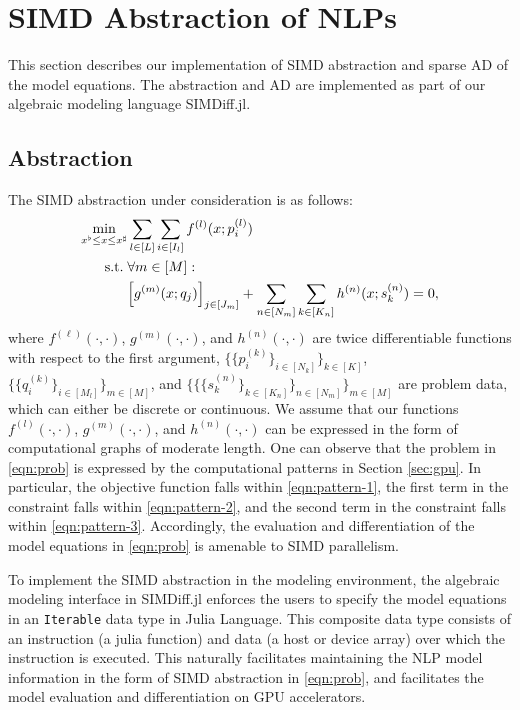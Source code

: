 \section{SIMD Abstraction of NLPs}\label{sec:simd}

This section describes our implementation of SIMD abstraction and
sparse AD of the model equations. The abstraction and AD are
implemented as part of our algebraic modeling language SIMDiff.jl.

\subsection{Abstraction}
The SIMD abstraction under consideration is as follows:
\begin{align}\label{eqn:prob}
  \min_{x^\flat\leq x \leq x^\sharp}
  & \sum_{l\in[L]}\sum_{i\in [I_l]} f^{(l)}(x; p^{(l)}_i)\\\nonumber
  \mathop{\text{\normalfont s.t.}}\; &\forall m\in[M]:\\\nonumber
  &\begin{aligned}[t]
    \left[g^{(m)}(x; q_j)\right]_{j\in [J_m]} +\sum_{n\in [N_m]}\sum_{k\in [K_n]}h^{(n)}(x; s^{(n)}_{k}) =0,
  \end{aligned}
  \end{align}
where $f^{(\ell)}(\cdot,\cdot)$, $g^{(m)}(\cdot,\cdot)$, and
$h^{(n)}(\cdot,\cdot)$ are twice differentiable functions with respect
to the first argument, $\{\{p^{(k)}_i\}_{i\in [N_k]}\}_{k\in[K]}$,
$\{\{q^{(k)}_{i}\}_{i\in [M_l]}\}_{m\in[M]}$, and
$\{\{\{s^{(n)}_{k}\}_{k\in[K_n]}\}_{n\in[N_m]}\}_{m\in[M]}$ are
problem data, which can either be discrete or continuous.  We assume
that our functions $f^{(l)}(\cdot,\cdot)$, $g^{(m)}(\cdot,\cdot)$, and
$h^{(n)}(\cdot,\cdot)$ can be expressed in the form of computational
graphs of moderate length. One can observe that the problem in
\eqref{eqn:prob} is expressed by the computational patterns in Section
\ref{sec:gpu}. In particular, the objective function falls within \ref{eqn:pattern-1},
the first term in the constraint falls within \ref{eqn:pattern-2}, and the second term in the constraint falls within \ref{eqn:pattern-3}.
Accordingly, the evaluation and differentiation of the
model equations in \eqref{eqn:prob} is amenable to SIMD parallelism.

To implement the SIMD abstraction in the modeling environment, the
algebraic modeling interface in SIMDiff.jl enforces the users to
specify the model equations in an {\tt Iterable} data type in
Julia Language. This composite data type consists of an instruction (a julia
function) and data (a host or device array) over which the instruction
is executed. This naturally facilitates maintaining the NLP model
information in the form of SIMD abstraction in \eqref{eqn:prob}, and
facilitates the model evaluation and differentiation on GPU
accelerators.

